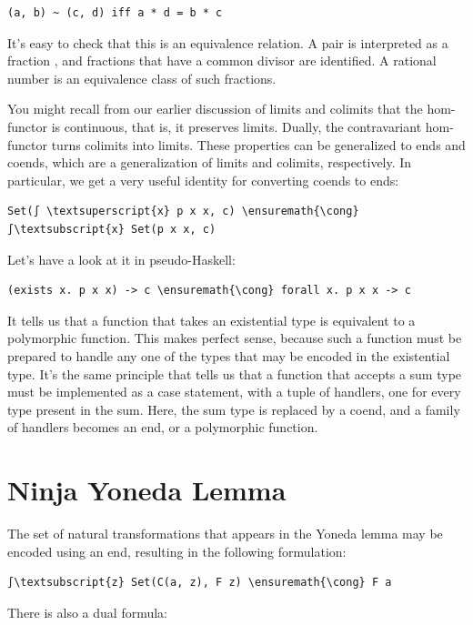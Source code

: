 \begin{verbatim}
(a, b) ~ (c, d) iff a * d = b * c
\end{verbatim}
It's easy to check that this is an equivalence relation. A pair
 is interpreted as a fraction , and
fractions that have a common divisor are identified. A rational number
is an equivalence class of such fractions.

You might recall from our earlier discussion of limits and colimits that
the hom-functor is continuous, that is, it preserves limits. Dually, the
contravariant hom-functor turns colimits into limits. These properties
can be generalized to ends and coends, which are a generalization of
limits and colimits, respectively. In particular, we get a very useful
identity for converting coends to ends:

\begin{Verbatim}[commandchars=\\\{\}]
Set(∫ \textsuperscript{x} p x x, c) \ensuremath{\cong} ∫\textsubscript{x} Set(p x x, c)
\end{Verbatim}
Let's have a look at it in pseudo-Haskell:

\begin{Verbatim}[commandchars=\\\{\}]
(exists x. p x x) -> c \ensuremath{\cong} forall x. p x x -> c
\end{Verbatim}
It tells us that a function that takes an existential type is equivalent
to a polymorphic function. This makes perfect sense, because such a
function must be prepared to handle any one of the types that may be
encoded in the existential type. It's the same principle that tells us
that a function that accepts a sum type must be implemented as a case
statement, with a tuple of handlers, one for every type present in the
sum. Here, the sum type is replaced by a coend, and a family of handlers
becomes an end, or a polymorphic function.

\section{Ninja Yoneda Lemma}\label{ninja-yoneda-lemma}

The set of natural transformations that appears in the Yoneda lemma may
be encoded using an end, resulting in the following formulation:

\begin{Verbatim}[commandchars=\\\{\}]
∫\textsubscript{z} Set(C(a, z), F z) \ensuremath{\cong} F a
\end{Verbatim}
There is also a dual formula:

